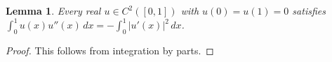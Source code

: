 \documentclass{article}
\newtheorem{lemma}{Lemma}
\begin{document}
\begin{lemma}\label{lem:parts}
Every real $u\in C^2([0,1])$ with $u(0)=u(1)=0$ satisfies
$\int_0^1 u(x)u''(x)\,dx=-\int_0^1 |u'(x)|^2\,dx$.
\end{lemma}
\begin{proof}
This follows from integration by parts.
\end{proof}
\end{document}
